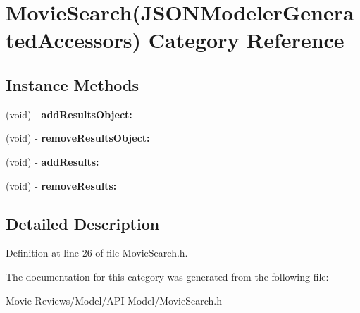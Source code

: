 \section{Movie\+Search(J\+S\+O\+N\+Modeler\+Generated\+Accessors) Category Reference}
\label{category_movie_search_07_j_s_o_n_modeler_generated_accessors_08}
\subsection*{Instance Methods}
\begin{DoxyCompactItemize}
\item 
(void) -\/ {\bfseries add\+Results\+Object\+:}\label{category_movie_search_07_j_s_o_n_modeler_generated_accessors_08_ad257f43478080c09878a24385f01a48d}

\item 
(void) -\/ {\bfseries remove\+Results\+Object\+:}\label{category_movie_search_07_j_s_o_n_modeler_generated_accessors_08_a7401bb23bcefebe777d8a4b79eb9a015}

\item 
(void) -\/ {\bfseries add\+Results\+:}\label{category_movie_search_07_j_s_o_n_modeler_generated_accessors_08_abd1b460770fe42d72462f45a9bf26ca4}

\item 
(void) -\/ {\bfseries remove\+Results\+:}\label{category_movie_search_07_j_s_o_n_modeler_generated_accessors_08_aa712540f1b1ff2a31572cdc507b5bad1}

\end{DoxyCompactItemize}


\subsection{Detailed Description}


Definition at line 26 of file Movie\+Search.\+h.



The documentation for this category was generated from the following file\+:\begin{DoxyCompactItemize}
\item 
Movie Reviews/\+Model/\+A\+P\+I Model/Movie\+Search.\+h\end{DoxyCompactItemize}

